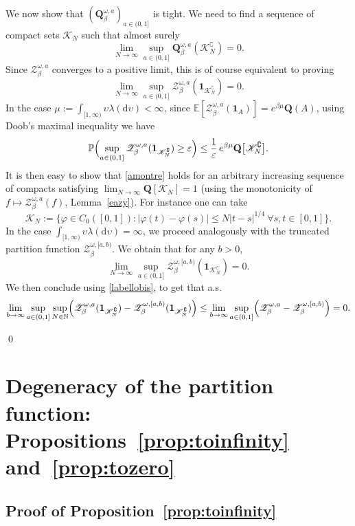 \documentclass[JEP,XML,SOM,Unicode,published]{cedram}
\let\mathcal\mathscr
\let\sep:
\theoremstyle{definition}
\newcommand{\dd}{\mathrm{d}}
\newcommand{\ind}{\mathbf{1}}
\let\cc\complement
\newcommand{\cK}{{\ensuremath{\mathcal K}} }
\newcommand{\cZ}{{\ensuremath{\mathcal Z}} }
\newcommand{\bQ}{{\ensuremath{\mathbf Q}} }
\newcommand{\bbE}{{\ensuremath{\mathbb E}} }
\newcommand{\bbN}{{\ensuremath{\mathbb N}} }
\newcommand{\bbP}{{\ensuremath{\mathbb P}} }
\let\gb\beta
\let\gep\varepsilon
\let\ups\upsilon
\let\go\omega
\begin{document}
We now show that $(\bQ^{\go,a}_{\beta})_{a\in (0,1]}$ is tight.
We need to find a sequence of
compact sets $\cK_N$ such that almost surely
\[
\lim_{N\to \infty} \sup_{a\in(0,1]} \bQ^{\go,a}_{\beta}(\cK^{\cc}_N)=0.
\]
Since $\cZ^{\go,a}_{\beta}$ converges to a positive limit, this is of course equivalent to proving
\begin{equation}\label{amontre}
\lim_{N\to \infty} \sup_{a\in(0,1]} \cZ^{\go,a}_{\beta} (\ind_{\cK^{\cc}_N}) =0.
\end{equation}
In the case $\mu:=\int_{[1,\infty)} \ups \lambda(\dd \ups) <\infty$, since $\bbE[\cZ^{\go,a}_{\beta}(\ind_A)]= e^{\gb\mu} \bQ(A)$, using Doob's maximal inequality we have
\begin{equation}
\bbP \Bigl(\sup_{a\in(0,1]} \cZ^{\go,a}_{\beta}(\ind_{\cK^{\cc}_N})\ge \gep \Bigr)
\le \frac{1}{\gep}\, e^{\gb \mu}\bQ\bigl[\cK^{\cc}_N\bigr].
\end{equation}
It is then easy to show that \eqref{amontre} holds for an arbitrary increasing sequence of compacts satisfying $\lim_{N\to \infty} \bQ[ \cK_N]=1$
(using the monotonicity of $f\mapsto \cZ^{\go,a}_{\beta}(f)$, \cf Lemma~\ref{eazy}).
For instance one can take
\[
\cK_N:= \bigl\{ \varphi\in C_0([0,1])\sep |\varphi(t)-\varphi(s)|\le N |t-s|^{1/4} \ \forall s,t\in [0,1] \bigr\}.
\]
In the case $\int_{[1,\infty)} \ups \lambda(\dd \ups) =\infty$,
we proceed analogously with the truncated partition function
$\cZ_{\gb}^{\go,[a,b)}$.
We obtain that for any $b>0$,
\[
\lim_{N\to\infty} \sup_{a\in (0,1]} \cZ_{\gb}^{\go,[a,b)} (\ind_{\cK_N^\cc}) =0.
\]
We then conclude using \eqref{labellobis}, to get that a.s.
\[
\lim_{b\to\infty} \sup_{a\in (0,1]} \sup_{N\in \bbN} \Bigl(\cZ_{\gb}^{\go,a} (\ind_{\cK_N^\cc}) - \cZ_{\gb}^{\go,[a,b)} (\ind_{\cK_N^\cc}) \Bigr)
\leq \lim_{b\to\infty} \sup_{a\in (0,1]} \Bigl(\cZ_{\gb}^{\go,a} - \cZ_{\gb}^{\go,[a,b)} \Bigr) =0.
\]
\par\vspace{-\baselineskip}
\qed

\section{Degeneracy of the partition function: Propositions~\ref{prop:toinfinity} and~\ref{prop:tozero}}
\label{sec:trivial}

\subsection{Proof of Proposition~\ref{prop:toinfinity}}
\label{sec:infinity}
\end{document}
